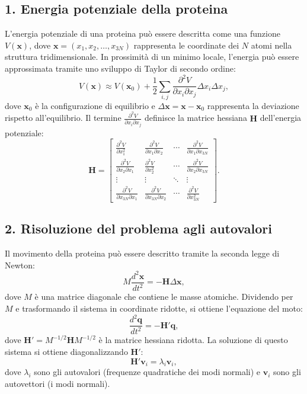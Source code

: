 \documentclass[Lau,binding=0.6cm,oneside,noexaminfo]{sapthesis}
\begin{document}
\subsection*{1. Energia potenziale della proteina}
L'energia potenziale di una proteina può essere descritta come una funzione $V(\mathbf{x})$, dove $\mathbf{x} = (x_1, x_2, \dots, x_{3N})$ rappresenta le coordinate dei $N$ atomi nella struttura tridimensionale. In prossimità di un minimo locale, l'energia può essere approssimata tramite uno sviluppo di Taylor di secondo ordine:
\[
V(\mathbf{x}) \approx V(\mathbf{x}_0) + \frac{1}{2} \sum_{i,j} \frac{\partial^2 V}{\partial x_i \partial x_j} \Delta x_i \Delta x_j,
\]
dove $\mathbf{x}_0$ è la configurazione di equilibrio e $\Delta \mathbf{x} = \mathbf{x} - \mathbf{x}_0$ rappresenta la deviazione rispetto all'equilibrio. Il termine $\frac{\partial^2 V}{\partial x_i \partial x_j}$ definisce la matrice hessiana $\mathbf{H}$ dell'energia potenziale:
\[
\mathbf{H} = \begin{bmatrix}
\frac{\partial^2 V}{\partial x_1^2} & \frac{\partial^2 V}{\partial x_1 \partial x_2} & \cdots & \frac{\partial^2 V}{\partial x_1 \partial x_{3N}} \\
\frac{\partial^2 V}{\partial x_2 \partial x_1} & \frac{\partial^2 V}{\partial x_2^2} & \cdots & \frac{\partial^2 V}{\partial x_2 \partial x_{3N}} \\
\vdots & \vdots & \ddots & \vdots \\
\frac{\partial^2 V}{\partial x_{3N} \partial x_1} & \frac{\partial^2 V}{\partial x_{3N} \partial x_2} & \cdots & \frac{\partial^2 V}{\partial x_{3N}^2}
\end{bmatrix}.
\]

\subsection*{2. Risoluzione del problema agli autovalori}
Il movimento della proteina può essere descritto tramite la seconda legge di Newton:
\[
M \frac{d^2 \mathbf{x}}{dt^2} = -\mathbf{H} \Delta \mathbf{x},
\]
dove $M$ è una matrice diagonale che contiene le masse atomiche. Dividendo per $M$ e trasformando il sistema in coordinate ridotte, si ottiene l'equazione del moto:
\[
\frac{d^2 \mathbf{q}}{dt^2} = -\mathbf{H}' \mathbf{q},
\]
dove $\mathbf{H}' = M^{-1/2} \mathbf{H} M^{-1/2}$ è la matrice hessiana ridotta. La soluzione di questo sistema si ottiene diagonalizzando $\mathbf{H}'$:
\[
\mathbf{H}' \mathbf{v}_i = \lambda_i \mathbf{v}_i,
\]
dove $\lambda_i$ sono gli autovalori (frequenze quadratiche dei modi normali) e $\mathbf{v}_i$ sono gli autovettori (i modi normali).
\end{document}
